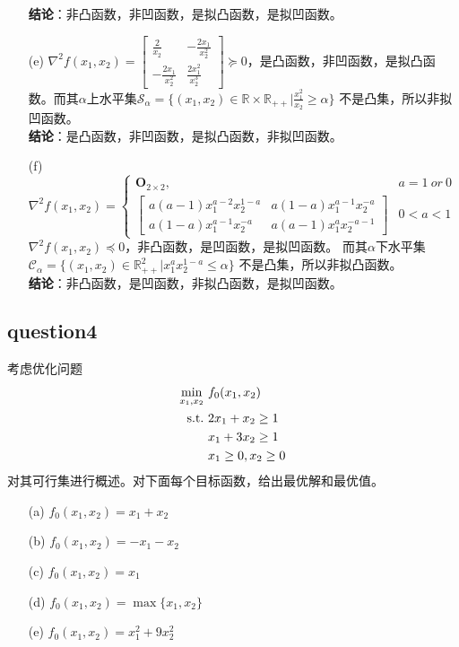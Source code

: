 \documentclass[12pt,a4paper]{ctexart}
\begin{document}
\begin{itemize}
    \textbf{结论}：非凸函数，非凹函数，是拟凸函数，是拟凹函数。
    \item[(e)] $\nabla^2f(x_1,x_2)=
    \begin{bmatrix}
        \frac{2}{x_2} & -\frac{2x_1}{x_2^2} \\
        -\frac{2x_1}{x_2^2} & \frac{2x_1^2}{x_2^3}
    \end{bmatrix} \succeq 0
    $，是凸函数，非凹函数，是拟凸函数。而其$\alpha$上水平集$\mathcal{S}_{\alpha}=\{(x_1,x_2) \in \mathbb{R}\times\mathbb{R}_{++} | \frac{x_1^2}{x_2}\geq \alpha\}$
    不是凸集，所以非拟凹函数。\\
    \textbf{结论}：是凸函数，非凹函数，是拟凸函数，非拟凹函数。
    \item[(f)]
    $
        \nabla^2f(x_1,x_2)=\left\{
        \begin{array}{ll}
        \boldsymbol{O}_{2 \times 2}, &a=1\ or\ 0\\
        \begin{bmatrix}
            a(a-1)x_1^{a-2}x_2^{1-a} & a(1-a)x_1^{a-1}x_2^{-a} \\
            a(1-a)x_1^{a-1}x_2^{-a} & a(a-1)x_1^{a}x_2^{-a-1}
        \end{bmatrix} & 0<a<1
        \end{array}
        \right.
    $
    $\nabla^2 f(x_1,x_2) \preceq 0$，非凸函数，是凹函数，是拟凹函数。
    而其$\alpha$下水平集$\mathcal{C}_{\alpha}=\{(x_1,x_2) \in \mathbb{R}^2_{++} | x_1^a x_2^{1-a}\leq \alpha\}$
    不是凸集，所以非拟凸函数。\\
    \textbf{结论}：非凸函数，是凹函数，非拟凸函数，是拟凹函数。

\end{itemize}  

\subsection*{question4}
考虑优化问题
\begin{align*}
\min_{x_1,x_2} \ &f_0(x_1,x_2) \\
\rm{s.t.}\  &2x_1+x_2 \geq 1\\
          & x_1+3x_2 \geq 1\\
          &x_1 \geq 0,x_2 \geq 0
\end{align*}
对其可行集进行概述。对下面每个目标函数，给出最优解和最优值。
\begin{itemize}
    \item[(a)] $f_0(x_1,x_2)=x_1+x_2$
    \item[(b)] $f_0(x_1,x_2)=-x_1-x_2$
    \item[(c)] $f_0(x_1,x_2)=x_1$
    \item[(d)] $f_0(x_1,x_2)=\max\{x_1,x_2\}$
    \item[(e)] $f_0(x_1,x_2)=x_1^2+9x_2^2$
\end{itemize}  
\end{document}

